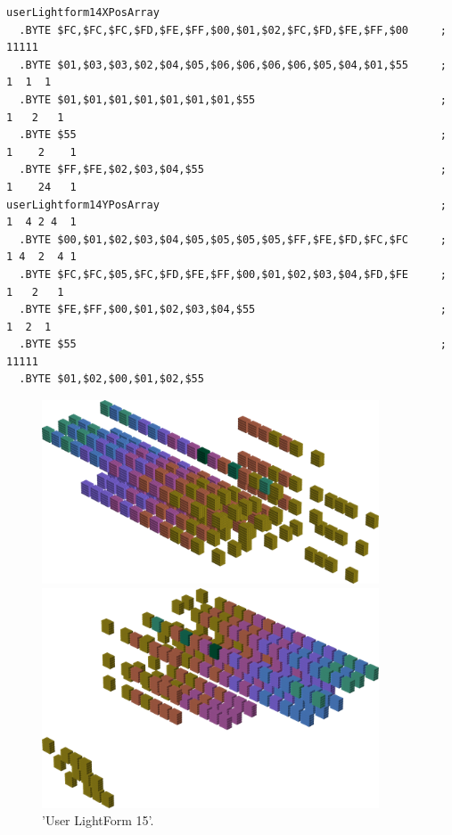 \begin{lstlisting}[basicstyle=\ttfamily\scriptsize]
userLightform14XPosArray
  .BYTE $FC,$FC,$FC,$FD,$FE,$FF,$00,$01,$02,$FC,$FD,$FE,$FF,$00     ;    11111   
  .BYTE $01,$03,$03,$02,$04,$05,$06,$06,$06,$06,$05,$04,$01,$55     ;   1  1  1  
  .BYTE $01,$01,$01,$01,$01,$01,$01,$55                             ;  1   2   1 
  .BYTE $55                                                         ; 1    2    1
  .BYTE $FF,$FE,$02,$03,$04,$55                                     ; 1    24   1
userLightform14YPosArray                                            ; 1  4 2 4  1
  .BYTE $00,$01,$02,$03,$04,$05,$05,$05,$05,$FF,$FE,$FD,$FC,$FC     ; 1 4  2  4 1
  .BYTE $FC,$FC,$05,$FC,$FD,$FE,$FF,$00,$01,$02,$03,$04,$FD,$FE     ;  1   2   1 
  .BYTE $FE,$FF,$00,$01,$02,$03,$04,$55                             ;   1  2  1  
  .BYTE $55                                                         ;    11111   
  .BYTE $01,$02,$00,$01,$02,$55
\end{lstlisting}


\begin{figure}[H]
    \centering
    \begin{adjustbox}{width=10cm,center}
      \includegraphics[width=10cm]{src/colorspace_patterns/pattern23-45.png}%
    \end{adjustbox}
    \begin{adjustbox}{width=10cm}
      \includegraphics[width=10cm]{src/colorspace_patterns/pattern23-225.png}%
    \end{adjustbox}
\caption{'User LightForm 15'.}
\end{figure}
\clearpage

